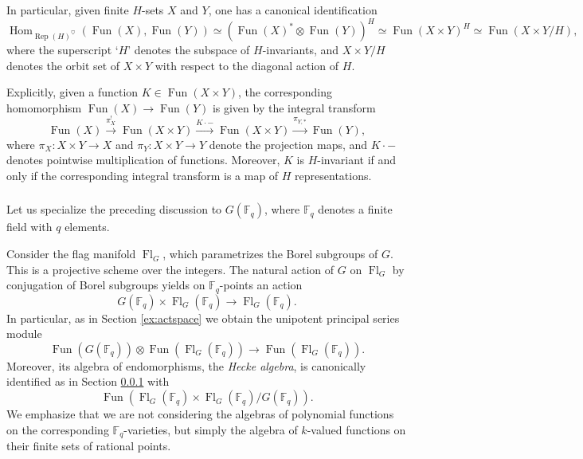 \documentclass[10pt]{amsart}
\newcommand{\sB}{\on{Fl}_G}
\newcommand{\on}{\operatorname}
\newcommand{\Fq}{\mathbb{F}_q}
\newcommand{\Fun}{\on{Fun}}
\theoremstyle{remark}
\numberwithin{equation}{section}
\begin{document}
	
	\subsubsection{} \label{sss:endos}
	
	In particular, given finite $H$-sets $X$ and $Y$, one has a canonical 
	identification 
	\[
	\on{Hom}_{\on{Rep}(H)^\heartsuit}( \Fun(X), \Fun(Y)) \simeq ( \Fun(X)^* \otimes 
	\Fun(Y))^{H} \simeq \Fun(X \times Y)^H \simeq \Fun(X \times Y/ H),
	\]
	where the superscript `$H$' denotes the subspace of $H$-invariants, and $X 
	\times Y / H$ denotes the orbit set of $X \times Y$ with respect to the 
	diagonal action of $H$. 
	
	Explicitly, given a function $K \in \Fun(X \times Y)$, the corresponding homomorphism $\Fun(X) \rightarrow \Fun(Y)$ is given by the integral transform 
	\[
	   \Fun(X) \xrightarrow{\pi_X^!} \Fun(X \times Y) \xrightarrow{ K \cdot - } \Fun(X \times Y) \xrightarrow{\pi_{Y, *}} \Fun(Y), 
	\]
	where $\pi_X: X \times Y \rightarrow X$ and $\pi_Y: X \times Y \rightarrow Y$ denote the projection maps, and $K \cdot -$ denotes pointwise multiplication of functions. Moreover, $K$ is $H$-invariant if and only if the corresponding integral transform is a map of $H$ representations. 
	
	
	\subsubsection{} Let us specialize the preceding discussion to 
	$G(\mathbb{F}_q)$, where $\mathbb{F}_q$ denotes a finite field with $q$ 
	elements.

	
	Consider the flag manifold $\sB$, which parametrizes the Borel subgroups of $G$. This is a projective scheme over the 
	integers. The natural action of $G$ on $\sB$ by conjugation of Borel subgroups yields on 
	$\mathbb{F}_q$-points an action 
	\[
	G(\mathbb{F}_q) \times \sB(\mathbb{F}_q) \rightarrow \sB(\mathbb{F}_q). 
	\]
	In particular, as in Section \ref{ex:actspace} we obtain the unipotent principal series module 
	\[
	\Fun(G(\mathbb{F}_q)) \otimes \Fun(\sB(\mathbb{F}_q)) \rightarrow 
	\Fun(\sB(\mathbb{F}_q)).
	\]
	Moreover, its algebra of endomorphisms, the {\em Hecke algebra}, is canonically 
	identified as in Section \ref{sss:endos} with 
	\[
	\Fun( \sB(\mathbb{F}_q) \times \sB(\mathbb{F}_q) / G(\mathbb{F}_q)). 
	\]
	We emphasize that we are not considering the algebras of polynomial 
	functions on the corresponding $\Fq$-varieties, but simply the algebra of 
	$k$-valued functions on their finite sets of rational points. 
	
\end{document}
